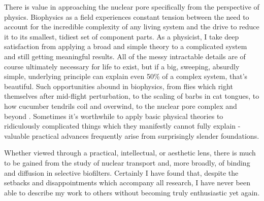  There is value in approaching the nuclear pore specifically from the perspective of physics.  Biophysics as a field experiences constant tension between the need to account for the incredible complexity of any living system and the drive to reduce it to its smallest, tidiest set of component parts.  As a physicist, I take deep satisfaction from applying a broad and simple theory to a complicated system and still getting meaningful results.  All of the messy intractable details are of course ultimately necessary for life to exist, but if a big, sweeping, absurdly simple, underlying principle can explain even 50\% of a complex system, that's beautiful.  Such opportunities abound in biophysics, from flies which right themselves after mid-flight perturbation, to the scaling of barbs in cat tongues, to how cucumber tendrils coil and overwind, to the nuclear pore complex and beyond \cite{ristroph12,noel18,gerbode12}.  Sometimes it's worthwhile to apply basic physical theories to ridiculously complicated things which they manifestly cannot fully explain - valuable practical advances frequently arise from surprisingly slender foundations.

Whether viewed through a practical, intellectual, or aesthetic lens, there is much to be gained from the study of nuclear transport and, more broadly, of binding and diffusion in selective biofilters.  Certainly I have found that, despite the setbacks and disappointments which accompany all research, I have never been able to describe my work to others without becoming truly enthusiastic yet again.




